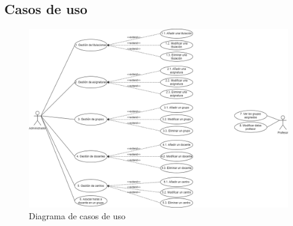 \subsection{Casos de uso}
\begin{figure}[!h]
	\centering
	\includegraphics[width=\textwidth]{../img/Anexos/Casos de uso.png}
	\caption{Diagrama de casos de uso}\label{fig:../img/Anexos/Casos de uso.png}
\end{figure}
\FloatBarrier

